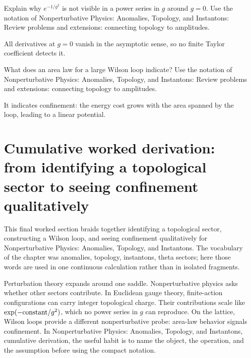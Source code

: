 \begin{exercise}
Explain why \(e^{-1/g^2}\) is not visible in a power series in \(g\) around \(g=0\).  Use the notation of Nonperturbative Physics: Anomalies, Topology, and Instantons: Review problems and extensions: connecting topology to amplitudes.
\begin{answer}
All derivatives at \(g=0\) vanish in the asymptotic sense, so no finite Taylor coefficient detects it.
\end{answer}
\end{exercise}

\begin{exercise}
What does an area law for a large Wilson loop indicate?  Use the notation of Nonperturbative Physics: Anomalies, Topology, and Instantons: Review problems and extensions: connecting topology to amplitudes.
\begin{answer}
It indicates confinement: the energy cost grows with the area spanned by the loop, leading to a linear potential.
\end{answer}
\end{exercise}



\section{Cumulative worked derivation: from identifying a topological sector to seeing confinement qualitatively}

This final worked section braids together identifying a topological sector, constructing a Wilson loop, and seeing confinement qualitatively for Nonperturbative Physics: Anomalies, Topology, and Instantons.  The vocabulary of the chapter was anomalies, topology, instantons, theta sectors; here those words are used in one continuous calculation rather than in isolated fragments.

Perturbation theory expands around one saddle.  Nonperturbative physics asks whether other sectors contribute.  In Euclidean gauge theory, finite-action configurations can carry integer topological charge.  Their contributions scale like \(\exp(-\hbox{constant}/g^2)\), which no power series in \(g\) can reproduce.  On the lattice, Wilson loops provide a different nonperturbative probe: area-law behavior signals confinement.  In Nonperturbative Physics: Anomalies, Topology, and Instantons, cumulative derivation, the useful habit is to name the object, the operation, and the assumption before using the compact notation.

